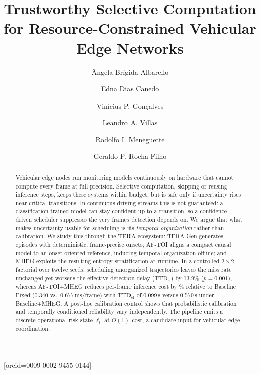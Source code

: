 \documentclass[a4paper,fleqn]{cas-dc}
\begin{document}
\title[mode=title]{Trustworthy Selective Computation for Resource-Constrained Vehicular Edge Networks}
\author[1]{{\^A}ngela Br\'igida Albarello}[orcid=0009-0002-9455-0144]
\cormark[1]
\author[1]{Edna Dias Canedo}
\author[1]{Vin\'icius P. Gon\c{c}alves}
\author[2]{Leandro A. Villas}
\author[3]{Rodolfo I. Meneguette}
\author[1,4]{Geraldo P. Rocha Filho}
\begin{abstract}
Vehicular edge nodes run monitoring models continuously on hardware that
cannot compute every frame at full precision. Selective computation, skipping
or reusing inference steps, keeps these systems within budget, but is safe
only if uncertainty rises near critical transitions. In
continuous driving streams this is not guaranteed: a classification-trained
model can stay confident up to a transition, so a confidence-driven scheduler
suppresses the very frames detection depends on. We argue that what makes
uncertainty usable for scheduling is its \emph{temporal organization} rather
than calibration. We study this through the TERA ecosystem: \mbox{TERA-Gen}
generates episodes with deterministic, frame-precise onsets; \mbox{AF-TOI}
aligns a compact causal model to an onset-oriented reference, inducing
temporal organization offline; and \mbox{MHEG} exploits the resulting entropy
stratification at runtime. In a controlled $2\times2$ factorial over twelve
seeds, scheduling unorganized trajectories leaves the miss rate unchanged yet
worsens the effective detection delay ($\mathrm{TTD}_{\mathrm{ef}}$) by 13.9\%
($p=0.001$), whereas \mbox{AF-TOI}+MHEG reduces per-frame inference cost by
\CostReduction\% relative to Baseline Fixed (0.340 vs.\ 0.677\,ms/frame) with
$\mathrm{TTD}_{\mathrm{ef}}$ of 0.099\,s versus 0.570\,s under Baseline+MHEG.
A post-hoc calibration control shows that probabilistic calibration and
temporally conditioned reliability vary independently. The pipeline emits a
discrete operational-risk state $\ell_t$ at $O(1)$ cost, a candidate input for
vehicular edge coordination.
\end{abstract}
\end{document}
